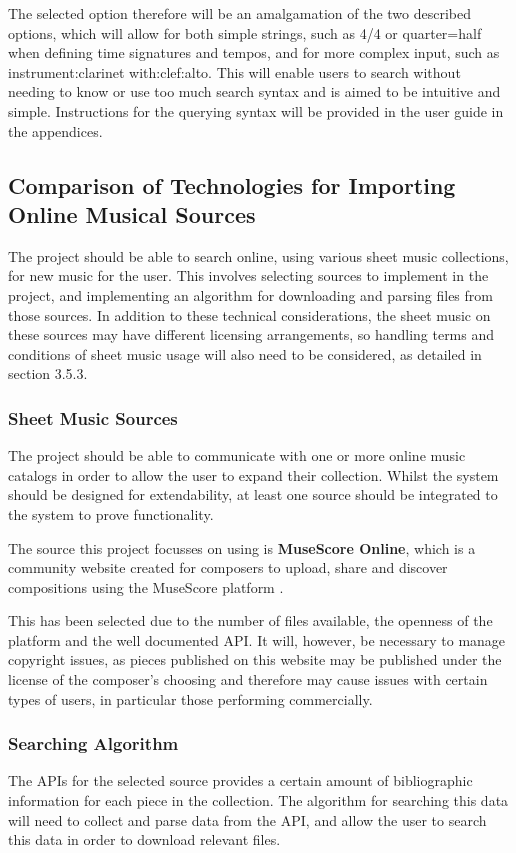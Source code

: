 The selected option therefore will be an amalgamation of the two described options, which will allow for both simple strings, such as 4/4 or quarter=half when defining time signatures and tempos, and for more complex input, such as instrument:clarinet with:clef:alto. This will enable users to search without needing to know or use too much search syntax and is aimed to be intuitive and simple. Instructions for the querying syntax will be provided in the user guide in the appendices.



\subsection{Comparison of Technologies for Importing Online Musical Sources}
The project should be able to search online, using various sheet music collections, for new music for the user. This involves selecting sources to implement in the project, and implementing an algorithm for downloading and parsing files from those sources. In addition to these technical considerations, the sheet music on these sources may have different licensing arrangements, so handling terms and conditions of sheet music usage will also need to be considered, as detailed in section 3.5.3.
\subsubsection{Sheet Music Sources}
The project should be able to communicate with one or more online music catalogs in order to allow the user to expand their collection. Whilst the system should be designed for extendability, at least one source should be integrated to the system to prove functionality.

The source this project focusses on using is \textbf{MuseScore Online}, which is a community website created for composers to upload, share and discover compositions using the MuseScore platform \parencite{MuseShare}.

This has been selected due to the number of files available, the openness of the platform and the well documented API. It will, however, be necessary to manage copyright issues, as pieces published on this website may be published under the license of the composer's choosing and therefore may cause issues with certain types of users, in particular those performing commercially.

\subsubsection{Searching Algorithm}
The APIs for the selected source provides a certain amount of bibliographic information for each piece in the collection. The algorithm for searching this data will need to collect and parse data from the API, and allow the user to search this data in order to download relevant files.

